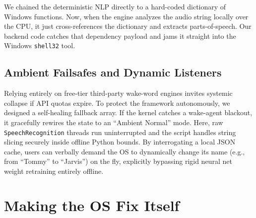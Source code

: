 \documentclass[conference]{IEEEtran}
\begin{document}
We chained the deterministic NLP directly to a hard-coded dictionary of Windows functions. Now, when the engine analyzes the audio string locally over the CPU, it just cross-references the dictionary and extracts parts-of-speech. Our backend code catches that dependency payload and jams it straight into the Windows \texttt{shell32} tool.

\subsection{Ambient Failsafes and Dynamic Listeners}
Relying entirely on free-tier third-party wake-word engines invites systemic collapse if API quotas expire. To protect the framework autonomously, we designed a self-healing fallback array. If the kernel catches a wake-agent blackout, it gracefully rewires the state to an ``Ambient Normal'' mode. Here, raw \texttt{SpeechRecognition} threads run uninterrupted and the script handles string slicing securely inside offline Python bounds. By interrogating a local JSON cache, users can verbally demand the OS to dynamically change its name (e.g., from ``Tommy'' to ``Jarvis'') on the fly, explicitly bypassing rigid neural net weight retraining entirely offline.


\begin{table}[htbp]
\centering
\caption{System Analog Integrity Bounds (\%)}
\label{table_performance}
\end{table}

\section{Making the OS Fix Itself}
\end{document}
